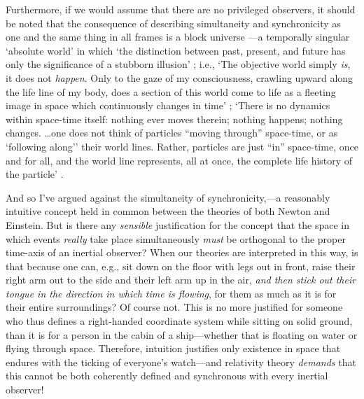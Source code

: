 \documentclass[11pt]{article}
\begin{document}
Furthermore, if we would assume that there are no privileged observers, it should be noted that the consequence of describing simultaneity and synchronicity as one and the same thing in all frames is a block universe \cite{Putnam1967}---a temporally singular `absolute world' \cite{Minkowski1908} in which `the distinction between past, present, and future has only the significance of a stubborn illusion' \cite{Foelsing1997}; i.e., `The objective world simply \textit{is}, it does not \textit{happen}. Only to the gaze of my consciousness, crawling upward along the life line of my body, does a section of this world come to life as a fleeting image in space which continuously changes in time' \cite{Weyl1949}; `There is no dynamics within space-time itself: nothing ever moves therein; nothing happens; nothing changes. \ldots one does not think of particles ``moving through'' space-time, or as `following along'' their world lines. Rather, particles are just ``in'' space-time, once and for all, and the world line represents, all at once, the complete life history of the particle' \cite{Geroch1978}.%

And so I've argued against the simultaneity of synchronicity,---a reasonably intuitive concept held in common between the theories of both Newton and Einstein. But is there any \textit{sensible} justification for the concept that the space in which events \textit{really} take place simultaneously \textit{must} be orthogonal to the proper time-axis of an inertial observer? When our theories are interpreted in this way, is that because one can, e.g., sit down on the floor with legs out in front, raise their right arm out to the side and their left arm up in the air, \textit{and then stick out their tongue in the direction in which time is flowing}, for them as much as it is for their entire surroundings? Of course not. This is no more justified for someone who thus defines a right-handed coordinate system while sitting on solid ground, than it is for a person in the cabin of a ship---whether that is floating on water or flying through space. Therefore, intuition justifies only existence in space that endures with the ticking of everyone's watch---and relativity theory \textit{demands} that this cannot be both coherently defined and synchronous with every inertial observer!
\end{document}
